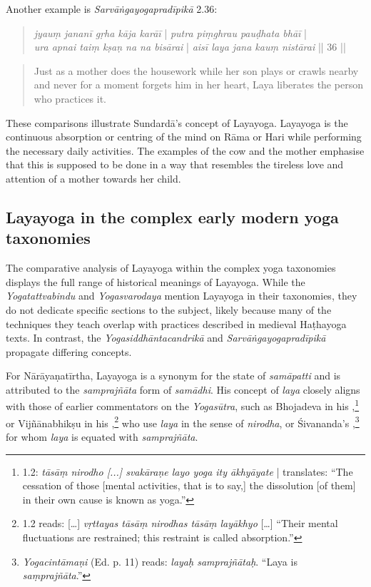 Another example is \textit{Sarvāṅgayogapradīpikā} 2.36:

\begin{quote}
\textit{jyauṃ jananī gṛha kāja karāī} | \textit{putra piṃghrau pauḍhata bhāī} |\\
\textit{ura apnai taiṃ kṣaṇ na na bisārai} | \textit{aisī laya jana kauṃ nistārai} || 36 ||
\end{quote}
\begin{quote}
Just as a mother does the housework while her son plays or crawls nearby and never for a moment forgets him in her heart, Laya liberates the person who practices it.
\end{quote}

These comparisons illustrate Sundardā's concept of Layayoga. Layayoga is the continuous absorption or centring of the mind on Rāma or Hari while performing the necessary daily activities. The examples of the cow and the mother emphasise that this is supposed to be done in a way that resembles the tireless love and attention of a mother towards her child.

\subsection{Layayoga in the complex early modern yoga taxonomies}

The comparative analysis of Layayoga within the complex yoga taxonomies displays the full range of historical meanings of Layayoga. While the \textit{Yogatattvabindu} and \textit{Yogasvarodaya} mention Layayoga in their taxonomies, they do not dedicate specific sections to the subject, likely because many of the techniques they teach overlap with practices described in medieval Haṭhayoga texts. In contrast, the \textit{Yogasiddhāntacandrikā} and \textit{Sarvāṅgayogapradīpikā} propagate differing concepts.

For Nārāyaṇatīrtha, Layayoga is a synonym for the state of \textit{samāpatti} and is attributed to the \textit{samprajñāta} form of \textit{samādhi}. His concept of \textit{laya} closely aligns with those of earlier commentators on the \textit{Yogasūtra}, such as Bhojadeva in his ,\footnote{ 1.2: \textit{tāsāṃ nirodho [...] svakāraṇe layo yoga ity ākhyāyate} | \citeauthor{amaraugha2024} translates: ``The cessation of those [mental activities, that is to say,] the dissolution [of them] in their own cause is known as yoga.''} or Vijñānabhikṣu in his ,\footnote{ 1.2 reads: [\ldots] \textit{vṛttayas tāsāṃ nirodhas tāsāṃ layākhyo} [\ldots] ``Their mental fluctuations are restrained; this restraint is called absorption.''} who use \textit{laya} in the sense of \textit{nirodha}, or Śivananda's ,\footnote{\emph{Yogacintāmaṇi} (Ed. p. 11) reads: \textit{layaḥ samprajñātaḥ}. ``Laya is \textit{saṃprajñāta}.''} for whom \textit{laya} is equated with \textit{samprajñāta}.

